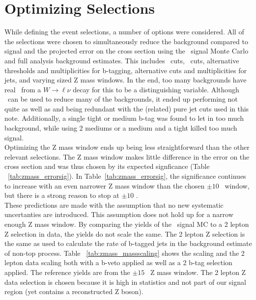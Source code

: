 \section{Optimizing Selections}
\label{sec:Optimization}

While defining the event selections, a number of options were considered. All of the selections were chosen to simultaneously reduce the  background compared to signal and the projected error on the cross section using the \ttZ \ signal Monte Carlo and full analysis background estimates. This includes \Ht \ cuts, \met \ cuts, alternative thresholds and multiplicities for b-tagging, alternative  \pt cuts and multiplicities for jets, and varying sized Z mass windows. In the end, too many backgrounds have real \met \ from a $W \rightarrow \ell \nu$ decay for this to be a distinguishing variable. Although \Ht \ can be used to reduce many of the backgrounds, it ended up performing not quite as well as and being redundant with the (related) pure jet cuts used in this note. Additionally, a single tight or medium  b-tag was found to let in too much background, while using 2 mediums or a medium and a tight killed too much signal.\\  

Optimizing the Z mass window ends up being less straightforward than the other relevant selections. The Z mass window makes little difference in the error on the cross section and was thus chosen by its expected signficance (Table ~\ref{tab:zmass_errorsig}). In Table~\ref{tab:zmass_errorsig}, the significance continues to increase with an even narrower Z mass window than the chosen $\pm 10$ \GeV \ window, but there is a strong reason to stop at $\pm 10$ \GeV.\\

These predictions are made with the assumption that no new systematic uncertanties are introduced. This assumption does not hold up for a narrow enough Z mass window. By comparing the yields of the \ttZ \ signal MC to a 2 lepton Z selection in data, the yields do not scale the same. The 2 lepton Z selection is the same as used to calculate the rate of b-tagged jets in the background estimate of non-top process. Table ~\ref{tab:zmass_massscaling} shows the \ttZ scaling and the 2 lepton data scaling both with a b-veto applied as well as a 2 b-tag selection applied. The reference yields are from the $\pm 15$ \GeV \ Z mass window. The 2 lepton Z data selection is chosen because it is high in statistics and not part of our signal region (yet contains a reconstructed Z boson).\\

